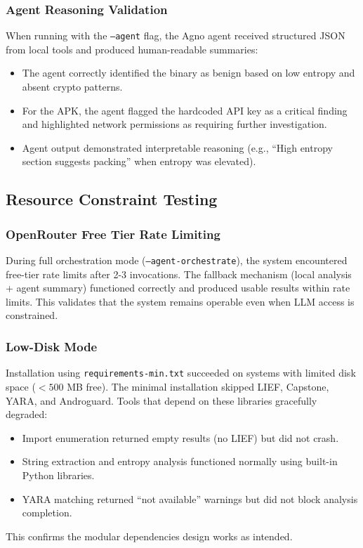 \documentclass[11pt]{article}
\begin{document}
\subsubsection{Agent Reasoning Validation}
When running with the \texttt{--agent} flag, the Agno agent received structured JSON from local tools and produced human-readable summaries:
\begin{itemize}[leftmargin=*]
  \item The agent correctly identified the binary as benign based on low entropy and absent crypto patterns.
  \item For the APK, the agent flagged the hardcoded API key as a critical finding and highlighted network permissions as requiring further investigation.
  \item Agent output demonstrated interpretable reasoning (e.g., ``High entropy section suggests packing'' when entropy was elevated).
\end{itemize}

\subsection{Resource Constraint Testing}
\subsubsection{OpenRouter Free Tier Rate Limiting}
During full orchestration mode (\texttt{--agent-orchestrate}), the system encountered free-tier rate limits after 2-3 invocations. The fallback mechanism (local analysis + agent summary) functioned correctly and produced usable results within rate limits. This validates that the system remains operable even when LLM access is constrained.

\subsubsection{Low-Disk Mode}
Installation using \texttt{requirements-min.txt} succeeded on systems with limited disk space ($< 500$ MB free). The minimal installation skipped LIEF, Capstone, YARA, and Androguard. Tools that depend on these libraries gracefully degraded:
\begin{itemize}[leftmargin=*]
  \item Import enumeration returned empty results (no LIEF) but did not crash.
  \item String extraction and entropy analysis functioned normally using built-in Python libraries.
  \item YARA matching returned ``not available'' warnings but did not block analysis completion.
\end{itemize}
This confirms the modular dependencies design works as intended.
\end{document}
